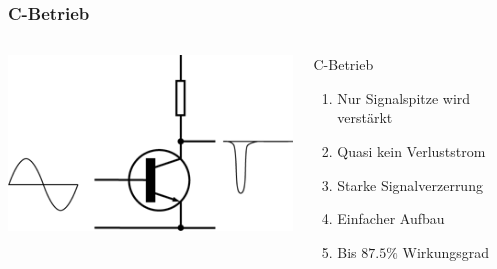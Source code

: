 \begin{frame}
  \frametitle{C-Betrieb}
  \begin{columns}[c]
    \begin{center}
      \includegraphics[width=1\textwidth,height=.8\textheight,keepaspectratio]{a07/Electronic_Amplifier_Class_C.png}\\
      {\tiny \hyperlink{refs}{\cite{wm}}}
    \end{center}
     \large
    \begin{block}{C-Betrieb}
      \begin{enumerate} 
        \item Nur Signalspitze wird verstärkt
        \item Quasi kein Verluststrom
        \item Starke Signalverzerrung
        \item Einfacher Aufbau
        \item Bis $87.5\%$ Wirkungsgrad
      \end{enumerate}
    \end{block}
  \end{columns}
\end{frame}

